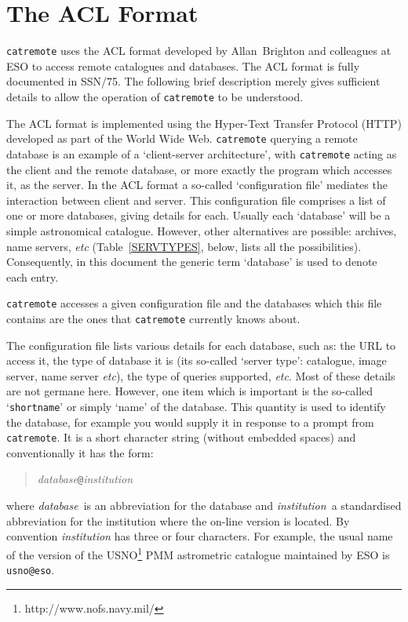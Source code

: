 \documentclass[twoside,11pt]{article}
\newcommand{\htmladdnormallinkfoot}[2]{#1\footnote{#2}}
\newcommand{\xref}[3]{#1}
\newcommand{\xlabel}[1]{}
\renewcommand{\_}{\texttt{\symbol{95}}}
\begin{document}
\section{\xlabel{ACL}\label{ACL}The ACL Format}

{\tt catremote} uses the ACL format developed by Allan~Brighton and
colleagues at ESO to access remote catalogues and databases.  The ACL
format is fully documented in \xref{SSN/75}{ssn75}{}\cite{SSN75}.  The
following brief description merely gives sufficient details to allow the
operation of {\tt catremote} to be understood.

The ACL format is implemented using the Hyper-Text Transfer Protocol (HTTP)
developed as part of the World Wide Web.  {\tt catremote} querying a
remote database is an example of a `client-server architecture', with
{\tt catremote} acting as the client and the remote database, or more
exactly the program which accesses it, as the server.  In the ACL format
a so-called `configuration file' mediates the interaction between client
and server.  This configuration file comprises a list of one or more
databases, giving details for each.  Usually each `database' will be a
simple astronomical catalogue.  However, other alternatives are possible:
archives, name servers, \emph{etc}\/ (Table~\ref{SERVTYPES}, below, lists
all the possibilities).  Consequently, in this document the
generic term `database' is used to denote each entry.

{\tt catremote} accesses a given configuration file and the databases
which this file contains are the ones that {\tt catremote} currently
knows about.

The configuration file lists various details for each database, such as:
the URL to access it, the type of database it is (its so-called
`server type': catalogue, image server, name server \emph{etc}\/), the
type of queries supported, \emph{etc}.  Most of these details are not
germane here.  However, one item which is important is the so-called
`{\tt short\_name}' or simply `name' of the database.  This quantity
is used to identify the database, for example you would supply it
in response to a prompt from {\tt catremote}.  It is a short character
string (without embedded spaces) and conventionally it has the form:

\begin{quote}
{\it database}{\tt @}{\it institution}
\end{quote}

where {\it database}\, is an abbreviation for the database and {\it
institution}\, a standardised abbreviation for the institution where the
on-line version is located.  By convention {\it institution}\/ has three
or four characters.  For example, the usual name of the version of the
\htmladdnormallinkfoot{USNO}{http://www.nofs.navy.mil/}
PMM astrometric catalogue maintained by ESO is {\tt usno@eso}.
\end{document}
